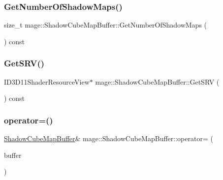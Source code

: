 \subsubsection{\texorpdfstring{Get\+Number\+Of\+Shadow\+Maps()}{GetNumberOfShadowMaps()}}
{\footnotesize\ttfamily size\+\_\+t mage\+::\+Shadow\+Cube\+Map\+Buffer\+::\+Get\+Number\+Of\+Shadow\+Maps (\begin{DoxyParamCaption}{ }\end{DoxyParamCaption}) const\hspace{0.3cm}{\ttfamily [noexcept]}}

\hypertarget{structmage_1_1_shadow_cube_map_buffer_ae1a6d1a26d482d6d145505b3b63bdb8d}{}\label{structmage_1_1_shadow_cube_map_buffer_ae1a6d1a26d482d6d145505b3b63bdb8d} 
\subsubsection{\texorpdfstring{Get\+S\+R\+V()}{GetSRV()}}
{\footnotesize\ttfamily I\+D3\+D11\+Shader\+Resource\+View$\ast$ mage\+::\+Shadow\+Cube\+Map\+Buffer\+::\+Get\+S\+RV (\begin{DoxyParamCaption}{ }\end{DoxyParamCaption}) const\hspace{0.3cm}{\ttfamily [noexcept]}}

\hypertarget{structmage_1_1_shadow_cube_map_buffer_abdb46d337840a5ffd76f12472d520eff}{}\label{structmage_1_1_shadow_cube_map_buffer_abdb46d337840a5ffd76f12472d520eff} 
\subsubsection{\texorpdfstring{operator=()}{operator=()}\hspace{0.1cm}{\footnotesize\ttfamily [1/2]}}
{\footnotesize\ttfamily \hyperlink{structmage_1_1_shadow_cube_map_buffer}{Shadow\+Cube\+Map\+Buffer}\& mage\+::\+Shadow\+Cube\+Map\+Buffer\+::operator= (\begin{DoxyParamCaption}\item[{const \hyperlink{structmage_1_1_shadow_cube_map_buffer}{Shadow\+Cube\+Map\+Buffer} \&}]{buffer }\end{DoxyParamCaption})\hspace{0.3cm}{\ttfamily [delete]}}

